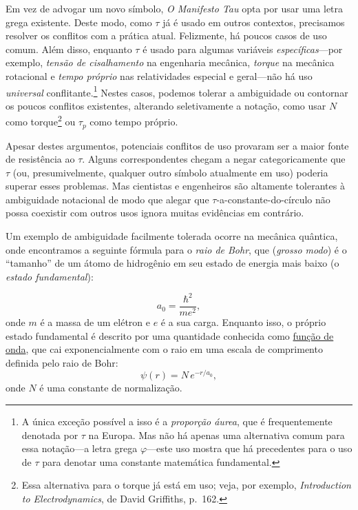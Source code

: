 Em vez de advogar um novo símbolo, \emph{O Manifesto Tau} opta por usar uma letra grega existente. Deste modo, como $\tau$ já é usado em outros contextos, precisamos resolver os conflitos com a prática atual. Felizmente, há poucos casos de uso comum. Além disso, enquanto $\tau$ é usado para algumas variáveis \emph{específicas}---por exemplo, \emph{tensão de cisalhamento} na engenharia mecânica, \emph{torque} na mecânica rotacional e \emph{tempo próprio} nas relatividades especial e geral---não há uso \emph{universal} conflitante.\footnote{A única exceção possível a isso é a \emph{proporção áurea}, que é frequentemente denotada por $\tau$ na Europa. Mas não há apenas uma alternativa comum para essa notação---a letra grega $\varphi$---este uso mostra que há precedentes para o uso de $\tau$ para denotar uma constante matemática fundamental.} Nestes casos, podemos tolerar a ambiguidade ou contornar os poucos conflitos existentes, alterando seletivamente a notação, como usar $N$ como torque\footnote{Essa alternativa para o torque já está em uso; veja, por exemplo, \emph{Introduction to Electrodynamics}, de David Griffiths, p.~162.} ou $\tau_p$ como tempo próprio.

Apesar destes argumentos, potenciais conflitos de uso provaram ser a maior fonte de resistência ao $\tau$. Alguns correspondentes chegam a negar categoricamente que $\tau$ (ou, presumivelmente, qualquer outro símbolo atualmente em uso) poderia superar esses problemas. Mas cientistas e engenheiros são altamente tolerantes à ambiguidade notacional de modo que alegar que $\tau$-a-constante-do-círculo não possa coexistir com outros usos ignora muitas evidências ​​em contrário.

Um exemplo de ambiguidade facilmente tolerada ocorre na mecânica quântica, onde encontramos a seguinte fórmula para o \emph{raio de Bohr}, que (\emph{grosso modo}) é o ``tamanho'' de um átomo de hidrogênio em seu estado de energia mais baixo (o \emph{estado fundamental}):

\[
a_0 = \frac{\hbar^2}{m e^2},
\]
onde $m$ é a massa de um elétron e $e$ é a sua carga. Enquanto isso, o próprio estado fundamental é descrito por uma quantidade conhecida como \href{https://pt.wikipedia.org/wiki/Fun%C3%A7%C3%A3o_de_onda}{função de onda}, que cai exponencialmente com o raio em uma escala de comprimento definida pelo raio de Bohr:
\begin{equation}
\label{eq:hydrogen}
\psi(r) = N\,e^{-r/a_0},
\end{equation}
onde $N$ é uma constante de normalização.

